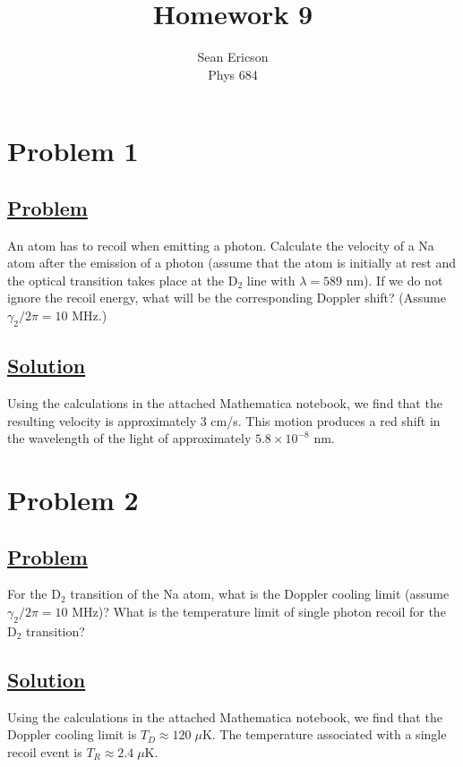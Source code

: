 \documentclass[12pt]{article}
\begin{document}
	
\title{Homework 9}
\author{Sean Ericson \\ Phys 684}
\maketitle

\section*{Problem 1}
\subsection*{\underline{Problem}}
An atom has to recoil when emitting a photon. 
Calculate the velocity of a Na atom after the emission of a photon (assume that the atom is initially at rest and the optical transition takes place at the $\text{D}_2$ line with $\lambda = 589$ nm).
If we do not ignore the recoil energy, what will be the corresponding Doppler shift? (Assume $\gamma_2/2\pi=10$ MHz.)

\subsection*{\underline{Solution}}
Using the calculations in the attached Mathematica notebook, we find that the resulting velocity is approximately 3 cm/s.
This motion produces a red shift in the wavelength of the light of approximately $5.8\times10^{-8}$ nm.

\section*{Problem 2}
\subsection*{\underline{Problem}}
For the $\text{D}_2$ transition of the Na atom, what is the Doppler cooling limit (assume $\gamma_2/2\pi=10$ MHz)?
What is the temperature limit of single photon recoil for the $\text{D}_2$ transition?

\subsection*{\underline{Solution}}
Using the calculations in the attached Mathematica notebook, we find that the Doppler cooling limit is $T_D \approx 120\;\mu$K. The temperature associated with a single recoil event is $T_R \approx 2.4\;\mu$K.
\end{document}
